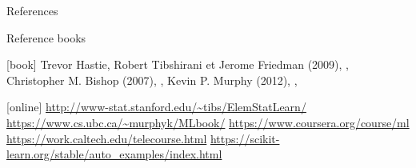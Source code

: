 \documentclass[pressentation,9pt,aspectratio=1610,xcolor=table]{beamer}
\begin{document}
\begin{frame}{References}
  \begin{block}{Reference books}
    \begin{thebibliography}{9}
      [book]
     Trevor Hastie, Robert Tibshirani et Jerome Friedman (2009), , \color{gray}{\it Springer Series in Statistics}
     Christopher M. Bishop (2007), , \color{gray}{\it Springer}
     Kevin P. Murphy (2012), , \color{gray}{\it MIT press}
    \end{thebibliography}
  \end{block}

  \begin{block}{}
    \begin{thebibliography}{9}
      [online]
     \url{http://www-stat.stanford.edu/~tibs/ElemStatLearn/}
     {\small \url{https://www.cs.ubc.ca/~murphyk/MLbook/} }
     \url{https://www.coursera.org/course/ml} \color{gray}{\scriptsize \it very popular MOOC (Andrew Ng)}
     \url{https://work.caltech.edu/telecourse.html} \color{gray}{\scriptsize \it more involved MOOC (Y. Abu-Mostafa)}
       \url{https://scikit-learn.org/stable/auto_examples/index.html} \color{gray}{\scriptsize \it Examples from the sklearn library}
    \end{thebibliography}
  \end{block}
\end{frame}
\end{document}
